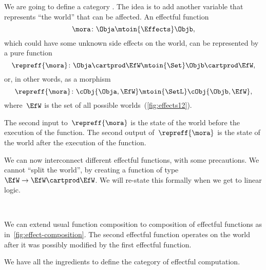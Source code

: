We are going to define a category \Effects.
The idea is to add another variable that represents ``the world'' that can be affected.
An effectful function
%
\begin{equation}
    \mora\colon \Obja \mtoin{\Effects} \Objb,
\end{equation}
%
which could have some unknown side effects on the world, can be represented by a pure function
\begin{equation}
    \repreff{\mora}\colon  \Obja  \cartprod \EfW \mtoin{\Set}   \Objb \cartprod \EfW,
\end{equation}
or, in other words, as a morphism
\begin{equation}
    \repreff{\mora}\colon  \cObj{\Obja,\EfW} \mtoin{\SetL}   \cObj{\Objb, \EfW},
\end{equation}
%
where~$\EfW$ is the set of all possible worlds~(\cref{fig:effects12}).

The second input to~$\repreff{\mora}$ is the state of the world before the execution of the function.
The second output of~$\repreff{\mora}$ is the state of the world after the execution of the function.

We can now interconnect different effectful functions, with some precautions.
We cannot ``split the world'', by creating a function of type~$\EfW \to  \EfW \cartprod \EfW$.
We will re-state this formally when we get to linear logic.

\begin{marginfigure}
    \centering
    \\
    \caption{}
    \label{fig:effect-composition}
\end{marginfigure}

We can extend usual function composition to composition of effectful functions as in~\cref{fig:effect-composition}.
The second effectful function operates on the world after it was possibly modified by the first effectful function.

We have all the ingredients to define the category \Effects of effectful computation.

